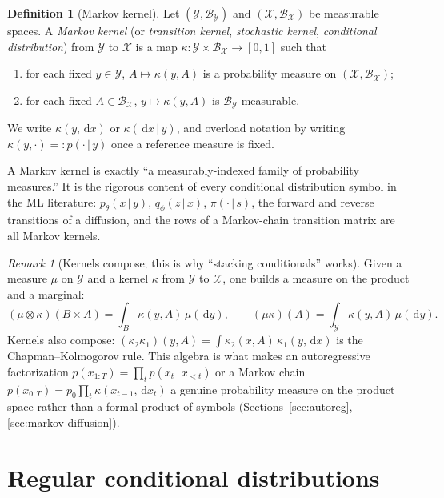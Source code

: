 \documentclass[11pt,oneside]{report}
\theoremstyle{plain}
\theoremstyle{definition}
\newtheorem{definition}[theorem]{Definition}
\theoremstyle{remark}
\newtheorem{remark}[theorem]{Remark}
\newcommand{\dd}{\,\mathrm{d}}
\newcommand{\Bcal}{\mathcal{B}}
\newcommand{\Xcal}{\mathcal{X}}
\newcommand{\Ycal}{\mathcal{Y}}
\newcommand{\given}{\,\vert\,}
\numberwithin{equation}{chapter}
\begin{document}
\begin{definition}[Markov kernel]\label{def:kernel}
Let $(\Ycal,\Bcal_\Ycal)$ and $(\Xcal,\Bcal_\Xcal)$ be measurable spaces.
A \emph{Markov kernel} (or \emph{transition kernel}, \emph{stochastic
kernel}, \emph{conditional distribution}) from $\Ycal$ to $\Xcal$ is a map
$\kappa:\Ycal\times\Bcal_\Xcal\to[0,1]$ such that
\begin{enumerate}[label=\textup{(K\arabic*)},leftmargin=3.2em]
\item for each fixed $y\in\Ycal$, $A\mapsto\kappa(y,A)$ is a probability
      measure on $(\Xcal,\Bcal_\Xcal)$;\label{k:meas}
\item for each fixed $A\in\Bcal_\Xcal$, $y\mapsto\kappa(y,A)$ is
      $\Bcal_\Ycal$-measurable.\label{k:meas2}
\end{enumerate}
We write $\kappa(y,\dd x)$ or $\kappa(\dd x\given y)$, and overload
notation by writing $\kappa(y,\cdot)=:p(\cdot\given y)$ once a reference
measure is fixed.
\end{definition}

A Markov kernel is exactly ``a measurably-indexed family of probability
measures.'' It is the rigorous content of every conditional distribution
symbol in the ML literature: $p_\theta(x\given y)$, $q_\phi(z\given x)$,
$\pi(\cdot\given s)$, the forward and reverse transitions of a diffusion,
and the rows of a Markov-chain transition matrix are all Markov kernels.

\begin{remark}[Kernels compose; this is why ``stacking conditionals''
works]\label{rem:kernel-compose}
Given a measure $\mu$ on $\Ycal$ and a kernel $\kappa$ from $\Ycal$ to
$\Xcal$, one builds a measure on the product and a marginal:
\begin{equation}
  (\mu\otimes\kappa)(B\times A)=\int_B \kappa(y,A)\,\mu(\dd y),\qquad
  (\mu\kappa)(A)=\int_\Ycal \kappa(y,A)\,\mu(\dd y).
\end{equation}
Kernels also compose: $(\kappa_2\kappa_1)(y,A)=\int\kappa_2(x,A)\,
\kappa_1(y,\dd x)$ is the Chapman--Kolmogorov rule. This algebra is what
makes an autoregressive factorization
$p(x_{1:T})=\prod_t p(x_t\given x_{<t})$ or a Markov chain
$p(x_{0:T})=p_0\prod_t \kappa(x_{t-1},\dd x_t)$ a genuine probability
measure on the product space rather than a formal product of symbols
(Sections~\ref{sec:autoreg}, \ref{sec:markov-diffusion}).
\end{remark}

\section{Regular conditional distributions}
\end{document}
